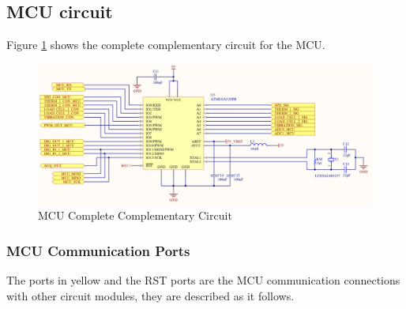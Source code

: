 		\subsection{MCU circuit}\label{ssec:mcu-circuit}

		Figure \ref{fig:mcu-circuit} shows the complete complementary circuit for the MCU.

		\begin{figure}[htbp]
			\centering
			\includegraphics[scale=0.7]{figuras/fig-mcu-circuit.png}
			\caption{MCU Complete Complementary Circuit \cite{mcu-circuit}}
			\label{fig:mcu-circuit}
		\end{figure}

			\subsubsection{MCU Communication Ports}\label{sssec:mcu-com-ports}
				The ports in yellow and the RST ports are the MCU communication connections with other circuit modules, they are described as it follows.

